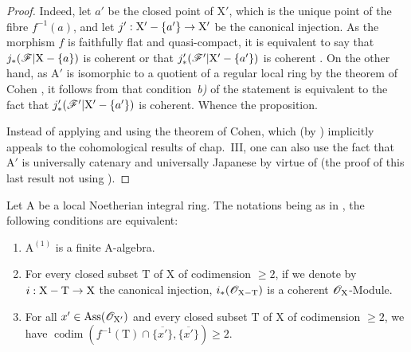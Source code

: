 \begin{proof}
Indeed, let $a'$ be the closed point of $\mathrm{X}'$, which is the unique point of the fibre $f^{-1}(a)$, and let $j':\mathrm{X}'-\{a'\}\to\mathrm{X}'$ be the canonical injection.
As the morphism $f$ is faithfully flat and quasi-compact, it is equivalent to say that $j_*(\mathscr{F}|\mathrm{X}-\{a\})$ is coherent or that $j'_*(\mathscr{F}'|\mathrm{X}'-\{a'\})$ is coherent .
On the other hand, as $\mathrm{A}'$ is isomorphic to a quotient of a regular local ring by the theorem of Cohen , it follows from  that condition~\emph{b)} of the statement is equivalent to the fact that $j'_*(\mathscr{F}'|\mathrm{X}'-\{a'\})$ is coherent.
Whence the proposition.

Instead of applying  and using the theorem of Cohen, which (by ) implicitly appeals to the cohomological results of chap.~III, one can also use the fact that $\mathrm{A}'$ is universally catenary  and universally Japanese by virtue of  (the proof of this last result not using ).
\end{proof}

\begin{proposition}[7.2.3]
\label{IV.7.2.3}
Let $\mathrm{A}$ be a local Noetherian integral ring.
The notations being as in , the following conditions are equivalent:
\begin{enumerate}[label=\emph{\alph*)}]
  \item $\mathrm{A}^{(1)}$ is a finite A-algebra.
  \item For every closed subset $\mathrm{T}$ of $\mathrm{X}$ of codimension $\geqslant 2$, if we denote by $i:\mathrm{X}-\mathrm{T}\to\mathrm{X}$ the canonical injection, $i_*(\mathscr{O}_{\mathrm{X}-\mathrm{T}})$ is a coherent $\mathscr{O}_\mathrm{X}$-Module.
  \item For all $x'\in\operatorname{Ass}(\mathscr{O}_{\mathrm{X}'})$ and every closed subset $\mathrm{T}$ of $\mathrm{X}$ of codimension $\geqslant 2$, we have $\operatorname{codim}(f^{-1}(\mathrm{T})\cap\overline{\{x'\}},\overline{\{x'\}})\geqslant 2$.
\end{enumerate}
\end{proposition}

